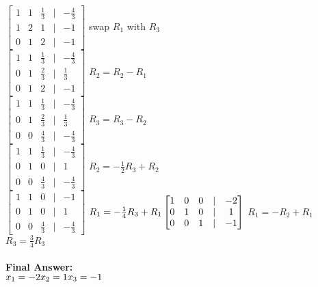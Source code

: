 \documentclass{article}
\begin{document}
\begin{aprob}
\begin{tcolorbox}[colback=lightgray!10!white, colframe=black, title=A6.b]
    \vspace{1em} \\
    $\begin{bmatrix} 1 & 1 & \frac{1}{3} & | & -\frac{4}{3} \\ 1 & 2 & 1 & | & -1 \\ 0 & 1 & 2 & | & -1 \end{bmatrix}$ swap $R_1$ with $R_3$
    \vspace{1em} \\
    $\begin{bmatrix} 1 & 1 & \frac{1}{3} & | & -\frac{4}{3} \\ 0 & 1 & \frac{2}{3} & | & \frac{1}{3} \\ 0 & 1 & 2 & | & -1 \end{bmatrix}$ $R_2 = R_2 - R_1$
    \vspace{1em} \\
    $\begin{bmatrix} 1 & 1 & \frac{1}{3} & | & -\frac{4}{3} \\ 0 & 1 & \frac{2}{3} & | & \frac{1}{3} \\ 0 & 0 & \frac{4}{3} & | & -\frac{4}{3} \end{bmatrix}$ $R_3 = R_3 - R_2$
    \vspace{1em} \\
    $\begin{bmatrix} 1 & 1 & \frac{1}{3} & | & -\frac{4}{3} \\ 0 & 1 & 0 & | & 1 \\ 0 & 0 & \frac{4}{3} & | & -\frac{4}{3} \end{bmatrix}$ $R_2 = -\frac{1}{2}R_3 + R_2$
    \vspace{1em} \\
    $\begin{bmatrix} 1 & 1 & 0 & | & -1 \\ 0 & 1 & 0 & | & 1 \\ 0 & 0 & \frac{4}{3} & | & -\frac{4}{3} \end{bmatrix}$ $R_1 = -\frac{1}{4}R_3 + R_1
    \vspace{1em} \\
    \begin{bmatrix} 1 & 0 & 0 & | & -2 \\ 0 & 1 & 0 & | & 1 \\ 0 & 0 & 1 & | & -1 \end{bmatrix}$ $R_1 = -R_2 + R_1$ \quad $R_3 = \frac{3}{4}R_3$ \\
    \vspace{1em} \\
    \textbf{Final Answer:} \\
    $x_1 = -2 \\ x_2 = 1 \\ x_3 = -1$
    \end{tcolorbox}
\end{aprob}
\end{document}
